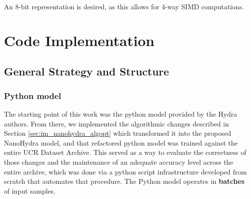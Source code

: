         An 8-bit representation is desired, as this allows for 4-way SIMD computations.

\section{Code Implementation}\label{sec:im_nanohydra_codeimp}

    \subsection{General Strategy and Structure}\label{sec:im_nanohydra_genstrat}

    \subsubsection{Python model}
    The starting point of this work was the python model provided by the Hydra authors. From there, we implemented the algorithmic changes described in Section \ref{sec:im_nanohydra_algopt}
    which transformed it into the proposed NanoHydra model, and that refactored python model was trained against the entire UCR Dataset Archive. This served as a way to evaluate the correctness of those changes 
    and the maintenance of an adequate accuracy level across the entire archive, which was done via a python script infrastructure developed from scratch
    that automates that procedure. The Python model operates in \textbf{batches} of input samples.

